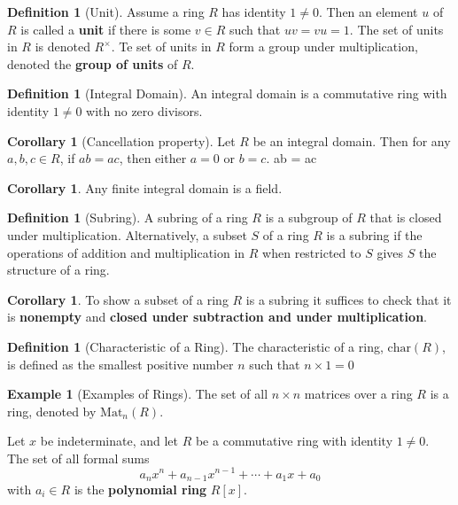 \documentclass[10pt, oneside, reqno]{amsart}
\theoremstyle{plain}%
\theoremstyle{definition}
\newtheorem{defn}[thm]{Definition}
\newtheorem{exmp}[thm]{Example}
\newtheorem{cor}[thm]{Corollary}
\theoremstyle{remark}
\newcommand{\charr}[1]{\text{char}(#1)}
\begin{document}
\begin{defn}[Unit]
    Assume a ring $R$ has identity $1 \neq 0$.  Then an element $u$ of $R$ is called a \textbf{unit} if there is some $v \in R$ such that $uv = vu = 1$.  The set of units in $R$ is denoted $R^{\times}$.  Te set of units in $R$ form a group under multiplication, denoted the \textbf{group of units} of $R$.
\end{defn}

\begin{defn}[Integral Domain]
    An integral domain is a commutative ring with identity $1 \neq 0$ with no zero divisors.
\end{defn}

\begin{cor}[Cancellation property]
    Let $R$ be an integral domain.  Then for any $a,b,c \in R$, if $ab = ac$, then either $a = 0$ or $b = c$. 
        ab = ac 
\end{cor}

\begin{cor}
    Any finite integral domain is a field.
\end{cor}

\begin{defn}[Subring]
    A subring of a ring $R$ is a subgroup of $R$ that is closed under multiplication.  Alternatively, a subset $S$ of a ring $R$ is a subring if the operations of addition and multiplication in $R$ when restricted to $S$ gives $S$ the structure of a ring.    
\end{defn}

\begin{cor}
    To show a subset of a ring $R$ is a subring it suffices to check that it is \textbf{nonempty} and \textbf{closed under subtraction and under multiplication}.
\end{cor}

\begin{defn}[Characteristic of a Ring]
    The characteristic of a ring, $\charr{R}$, is defined as the smallest positive number $n$ such that $ n \times 1 = 0$
\end{defn}

\begin{exmp}[Examples of Rings]
    The set of all $n \times n$ matrices over a ring $R$ is a ring, denoted by $\text{Mat}_n(R)$.
    
    Let $x$ be indeterminate, and let $R$ be a commutative ring with identity $1 \neq 0$.  The set of all formal sums \[
        a_n x^n + a_{n-1} x^{n-1} + \cdots + a_1 x + a_0 
    \] with $a_i \in R$ is the \textbf{polynomial ring} $R[x]$.
\end{exmp}
\end{document}
